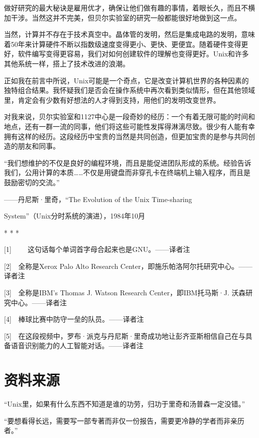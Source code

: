 \documentclass[a4paper,12pt,UTF8,twoside]{ctexbook}
\begin{document}
做好研究的最大秘诀是雇用优才，确保让他们做有趣的事情，着眼长久，而且不横加干涉。当然这并不完美，但贝尔实验室的研究一般都能很好地做到这一点。

当然，计算并不存在于技术真空中。晶体管的发明，然后是集成电路的发明，意味着50年来计算硬件不断以指数级速度变得更小、更快、更便宜。随着硬件变得更好，软件编写变得更容易，我们对如何创建软件的理解也变得更好。Unix和许多其他系统一样，搭上了技术改进的浪潮。

正如我在前言中所说，Unix可能是一个奇点，它是改变计算机世界的各种因素的独特组合结果。我怀疑我们是否会在操作系统中再次看到类似情形，但在其他领域里，肯定会有少数有好想法的人才得到支持，用他们的发明改变世界。

对我来说，贝尔实验室和1127中心是一段奇妙的经历：一个有着无限可能的时间和地点，还有一群一流的同事，他们将这些可能性发挥得淋漓尽致。很少有人能有幸拥有这样的经历。这段经历中宝贵的当然是共同创造，但更加宝贵的是参与共同创造的朋友和同事。

“我们想维护的不仅是良好的编程环境，而且是能促进团队形成的系统。经验告诉我们，公用计算的本质……不仅是用键盘而非穿孔卡在终端机上输入程序，而且是鼓励密切的交流。”

——丹尼斯·里奇，“The Evolution of the Unix Time-sharing

System”（Unix分时系统的演进），1984年10月





* * *



[1]　 　这句话每个单词首字母合起来也是GNU。——译者注

[2]　全称是Xerox Palo Alto Research Center，即施乐帕洛阿尔托研究中心。——译者注

[3]　全称是IBM’s Thomas J. Watson Research Center，即IBM托马斯·J. 沃森研究中心。——译者注

[4]　棒球比赛中防守一垒的队员。——译者注

[5]　在这段视频中，罗布·派克与丹尼斯·里奇成功地让彭齐亚斯相信自己在与具备语音识别能力的人工智能对话。——译者注


\backmatter

\chapter{资料来源}

“Unix里，如果有什么东西不知道是谁的功劳，归功于里奇和汤普森一定没错。”

“要想看得长远，需要写一部专著而非仅一份报告，需要更冷静的学者而非亲历者。”
\end{document}
